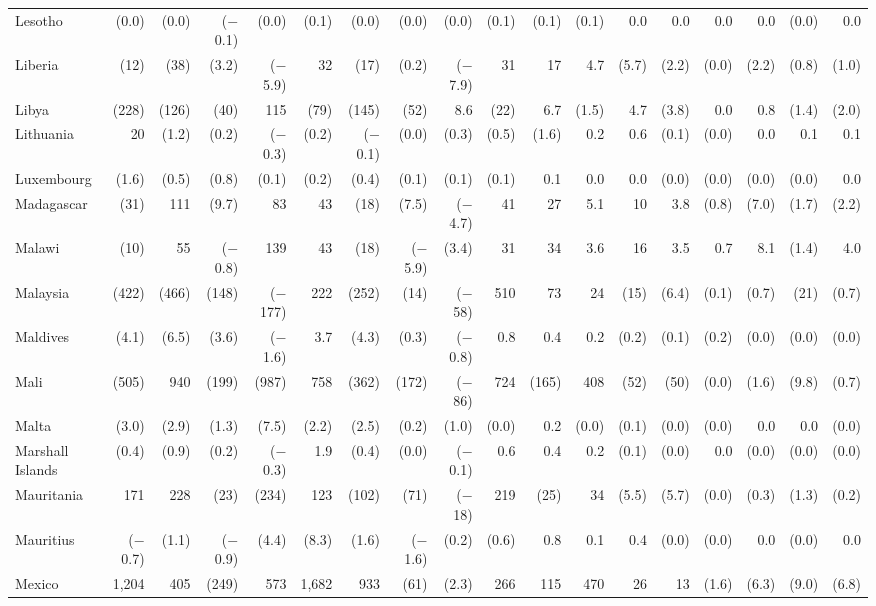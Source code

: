 \begin{longtable}{lrrrrrrrrrrrrrrrrr}
Lesotho & (0.0) & (0.0) & ($-$0.1) & (0.0) & (0.1) & (0.0) & (0.0) & (0.0) & (0.1) & (0.1) & (0.1) & 0.0 & 0.0 & 0.0 & 0.0 & (0.0) & 0.0 \\
Liberia & (12) & (38) & (3.2) & ($-$5.9) & 32 & (17) & (0.2) & ($-$7.9) & 31 & 17 & 4.7 & (5.7) & (2.2) & (0.0) & (2.2) & (0.8) & (1.0) \\
Libya & (228) & (126) & (40) & 115 & (79) & (145) & (52) & 8.6 & (22) & 6.7 & (1.5) & 4.7 & (3.8) & 0.0 & 0.8 & (1.4) & (2.0) \\
Lithuania & 20 & (1.2) & (0.2) & ($-$0.3) & (0.2) & ($-$0.1) & (0.0) & (0.3) & (0.5) & (1.6) & 0.2 & 0.6 & (0.1) & (0.0) & 0.0 & 0.1 & 0.1 \\
Luxembourg & (1.6) & (0.5) & (0.8) & (0.1) & (0.2) & (0.4) & (0.1) & (0.1) & (0.1) & 0.1 & 0.0 & 0.0 & (0.0) & (0.0) & (0.0) & (0.0) & 0.0 \\
Madagascar & (31) & 111 & (9.7) & 83 & 43 & (18) & (7.5) & ($-$4.7) & 41 & 27 & 5.1 & 10 & 3.8 & (0.8) & (7.0) & (1.7) & (2.2) \\
Malawi & (10) & 55 & ($-$0.8) & 139 & 43 & (18) & ($-$5.9) & (3.4) & 31 & 34 & 3.6 & 16 & 3.5 & 0.7 & 8.1 & (1.4) & 4.0 \\
Malaysia & (422) & (466) & (148) & ($-$177) & 222 & (252) & (14) & ($-$58) & 510 & 73 & 24 & (15) & (6.4) & (0.1) & (0.7) & (21) & (0.7) \\
Maldives & (4.1) & (6.5) & (3.6) & ($-$1.6) & 3.7 & (4.3) & (0.3) & ($-$0.8) & 0.8 & 0.4 & 0.2 & (0.2) & (0.1) & (0.2) & (0.0) & (0.0) & (0.0) \\
Mali & (505) & 940 & (199) & (987) & 758 & (362) & (172) & ($-$86) & 724 & (165) & 408 & (52) & (50) & (0.0) & (1.6) & (9.8) & (0.7) \\
Malta & (3.0) & (2.9) & (1.3) & (7.5) & (2.2) & (2.5) & (0.2) & (1.0) & (0.0) & 0.2 & (0.0) & (0.1) & (0.0) & (0.0) & 0.0 & 0.0 & (0.0) \\
Marshall Islands & (0.4) & (0.9) & (0.2) & ($-$0.3) & 1.9 & (0.4) & (0.0) & ($-$0.1) & 0.6 & 0.4 & 0.2 & (0.1) & (0.0) & 0.0 & (0.0) & (0.0) & (0.0) \\
Mauritania & 171 & 228 & (23) & (234) & 123 & (102) & (71) & ($-$18) & 219 & (25) & 34 & (5.5) & (5.7) & (0.0) & (0.3) & (1.3) & (0.2) \\
Mauritius & ($-$0.7) & (1.1) & ($-$0.9) & (4.4) & (8.3) & (1.6) & ($-$1.6) & (0.2) & (0.6) & 0.8 & 0.1 & 0.4 & (0.0) & (0.0) & 0.0 & (0.0) & 0.0 \\
Mexico & 1,204 & 405 & (249) & 573 & 1,682 & 933 & (61) & (2.3) & 266 & 115 & 470 & 26 & 13 & (1.6) & (6.3) & (9.0) & (6.8) \\

\end{longtable}
